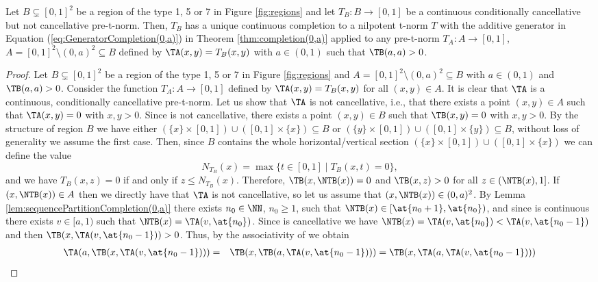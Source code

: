\begin{theorem}\label{thm:CompletionsCases1,5,7}
	Let $B \subsetneq [0,1]^2$ be a region of the type 1, 5 or 7 in Figure \ref{fig:regions} and let $T_B : B \to [0,1]$ be a continuous conditionally cancellative but not cancellative pre-t-norm. Then, $T_B$ has a unique continuous completion to a nilpotent t-norm $T$ with the additive generator in Equation (\ref{eq:GeneratorCompletion(0,a)}) in Theorem \ref{thm:completion(0,a)} applied to any pre-t-norm $T_A : A \to [0,1]$, $A = [0,1]^2 \setminus (0,a)^2 \subseteq B$ defined by $\TA(x,y)=T_B(x,y)$ with $a \in (0,1)$ such that $\TB(a,a)>0$.
\end{theorem}
\begin{proof}
	Let $B \subsetneq [0,1]^2$ be a region of the type 1, 5 or 7 in Figure \ref{fig:regions} and $A = [0,1]^2 \setminus (0,a)^2 \subseteq B$ with $a \in (0,1)$ and $\TB(a,a)>0$. Consider the function $T_A : A \to [0,1]$ defined by $\TA(x,y)=T_B(x,y)$ for all $(x,y) \in A$. It is clear that $\TA$ is a continuous, conditionally cancellative pre-t-norm. Let us show that $\TA$ is not cancellative, i.e., that there exists a point $(x,y) \in A$ such that $\TA(x,y)=0$ with $x,y>0$. Since \TB is not cancellative, there exists a point $(x,y) \in B$ such that $\TB(x,y)=0$ with $x,y>0$. By the structure of region $B$ we have either $(\{x\}\times [0,1]) \cup ([0,1] \times \{x\})\subseteq B$ or $(\{y\}\times [0,1]) \cup ([0,1] \times \{y\})\subseteq B$, without loss of generality we assume the first case. Then, since $B$ contains the whole horizontal/vertical section $(\{x\} \times [0,1]) \cup ([0,1] \times \{x\})$ we can define the value
	$$N_{T_B}(x) = \max \{t \in [0,1] \mid T_B(x,t)=0\},$$
	and we have $T_B(x,z)=0$ if and only if $z \leq N_{T_B}(x)$. Therefore, $\TB(x,\NTB(x))=0$ and $\TB(x,z)>0$ for all $z \in (\NTB(x),1]$. If $(x,\NTB(x)) \in A$ then we directly have that $\TA$ is not cancellative, so let us assume that $(x,\NTB(x)) \in (0,a)^2$.  By Lemma \ref{lem:sequencePartitionCompletion(0,a)} there exists $n_0 \in \NN$, $n_0\geq 1$, such that $\NTB(x) \in [\at{n_0+1},\at{n_0})$, and since \TA is continuous there exists $v \in [a,1)$ such that $\NTB(x)= \TA(v,\at{n_0})$. Since \TA is cancellative we have $\NTB(x) = \TA(v,\at{n_0}) < \TA(v,\at{n_0-1})$ and then $\TB(x,\TA(v,\at{n_0-1}))>0$. Thus, by the associativity of \TB we obtain
	\begin{eqnarray*}
		\TA(a,\TB(x,\TA(v,\at{n_0-1}))) &=& \TB(x,\TB(a,\TA(v,\at{n_0-1}))) = \TB(x,\TA(a,\TA(v,\at{n_0-1}))) \\

\end{eqnarray*}
\end{proof}
